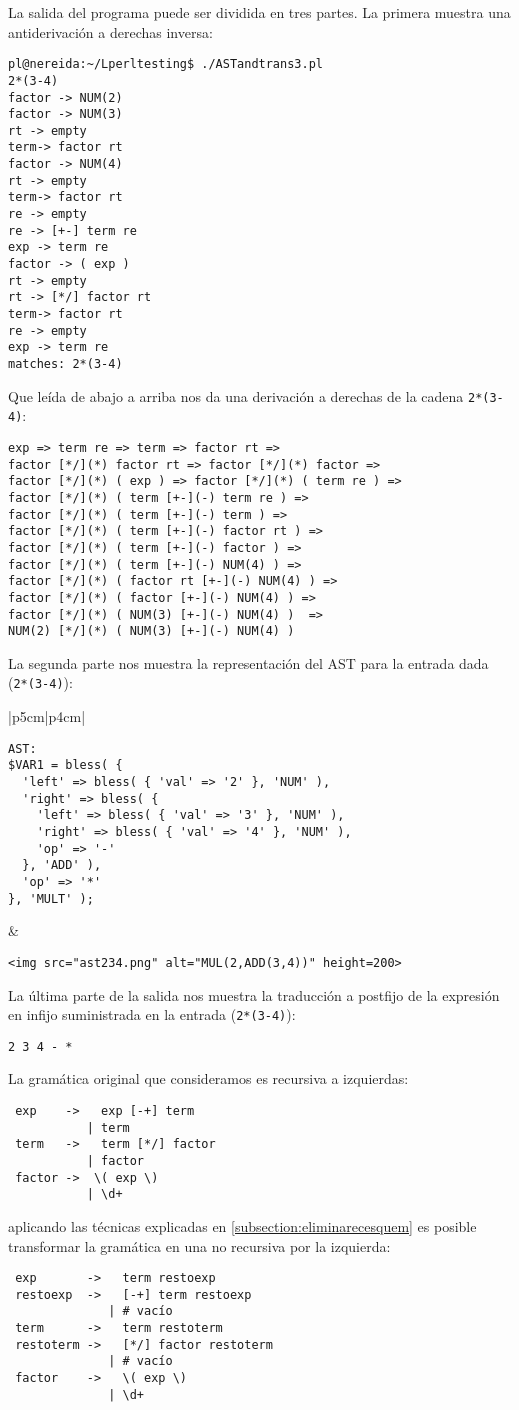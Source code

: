 La salida del programa puede ser dividida en tres partes.
La primera muestra una antiderivación a derechas inversa:
\begin{verbatim}
pl@nereida:~/Lperltesting$ ./ASTandtrans3.pl
2*(3-4)
factor -> NUM(2)
factor -> NUM(3)
rt -> empty
term-> factor rt
factor -> NUM(4)
rt -> empty
term-> factor rt
re -> empty
re -> [+-] term re
exp -> term re
factor -> ( exp )
rt -> empty
rt -> [*/] factor rt
term-> factor rt
re -> empty
exp -> term re
matches: 2*(3-4)
\end{verbatim}
Que leída de abajo a arriba nos da una derivación a derechas de la cadena \verb|2*(3-4)|:
\begin{verbatim}
exp => term re => term => factor rt => 
factor [*/](*) factor rt => factor [*/](*) factor => 
factor [*/](*) ( exp ) => factor [*/](*) ( term re ) =>  
factor [*/](*) ( term [+-](-) term re ) =>  
factor [*/](*) ( term [+-](-) term ) => 
factor [*/](*) ( term [+-](-) factor rt ) =>
factor [*/](*) ( term [+-](-) factor ) => 
factor [*/](*) ( term [+-](-) NUM(4) ) =>
factor [*/](*) ( factor rt [+-](-) NUM(4) ) => 
factor [*/](*) ( factor [+-](-) NUM(4) ) =>
factor [*/](*) ( NUM(3) [+-](-) NUM(4) )  => 
NUM(2) [*/](*) ( NUM(3) [+-](-) NUM(4) )
\end{verbatim}
La segunda parte nos muestra la representación del AST para la entrada dada (\verb|2*(3-4)|):
\begin{tabular}{|p{5cm}|p{4cm}|}
\begin{verbatim}
AST:
$VAR1 = bless( {
  'left' => bless( { 'val' => '2' }, 'NUM' ),
  'right' => bless( {
    'left' => bless( { 'val' => '3' }, 'NUM' ),
    'right' => bless( { 'val' => '4' }, 'NUM' ),
    'op' => '-'
  }, 'ADD' ),
  'op' => '*'
}, 'MULT' );
\end{verbatim}
&
\begin{verbatim}
<img src="ast234.png" alt="MUL(2,ADD(3,4))" height=200>
\end{verbatim}
\end{tabular}

La última parte de la salida nos muestra la traducción a postfijo
de la expresión en infijo
suministrada en la entrada (\verb|2*(3-4)|):
\begin{verbatim}
2 3 4 - *
\end{verbatim}


La gramática original que consideramos
es recursiva a izquierdas:
\begin{verbatim}
 exp    ->   exp [-+] term
           | term
 term   ->   term [*/] factor
           | factor
 factor ->  \( exp \)
           | \d+
\end{verbatim}
aplicando las técnicas explicadas en
\ref{subsection:eliminarecesquem}
es posible transformar la gramática 
en una no recursiva por la izquierda:
\begin{verbatim}
 exp       ->   term restoexp
 restoexp  ->   [-+] term restoexp
              | # vacío
 term      ->   term restoterm
 restoterm ->   [*/] factor restoterm
              | # vacío
 factor    ->   \( exp \)
              | \d+
\end{verbatim}

